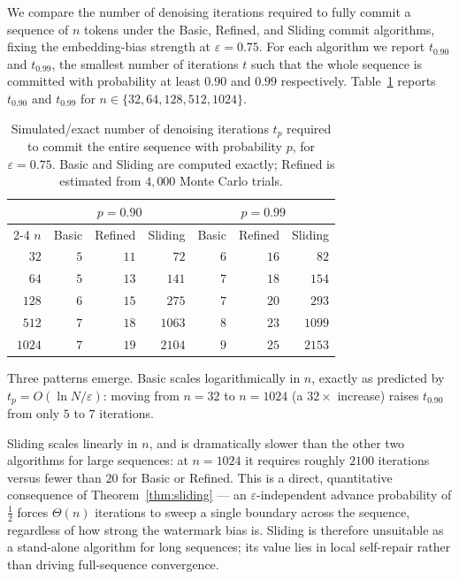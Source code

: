 \documentclass[a4paper,11pt]{llncs}
\begin{document}
\begin{example}
We compare the number of denoising iterations required to fully
commit a sequence of $n$ tokens under the Basic, Refined, and
Sliding commit algorithms, fixing the embedding-bias strength at
$\varepsilon=0.75$. For each algorithm we report $t_{0.90}$ and
$t_{0.99}$, the smallest number of iterations $t$ such that the
whole sequence is committed with probability at least $0.90$ and
$0.99$ respectively.
Table~\ref{tab:sim-comparison} reports $t_{0.90}$ and $t_{0.99}$
for $n\in\{32,64,128,512,1024\}$.
%
\begin{table}[ht]
\centering
\caption{Simulated/exact number of denoising iterations $t_p$
required to commit the entire sequence with probability $p$, for
$\varepsilon=0.75$. Basic and Sliding are computed exactly;
Refined is estimated from $4{,}000$ Monte Carlo trials.}
\label{tab:sim-comparison}
\begin{tabular}{r rrr rrr}
\hline
 & \multicolumn{3}{c}{$p=0.90$} & \multicolumn{3}{c}{$p=0.99$} \\
\cline{2-4}\cline{5-7}
$n$ & Basic & Refined & Sliding & Basic & Refined & Sliding \\
\hline
$32$   & $5$ & $11$ & $72$    & $6$ & $16$ & $82$    \\
$64$   & $5$ & $13$ & $141$   & $7$ & $18$ & $154$   \\
$128$  & $6$ & $15$ & $275$   & $7$ & $20$ & $293$   \\
$512$  & $7$ & $18$ & $1063$  & $8$ & $23$ & $1099$  \\
$1024$ & $7$ & $19$ & $2104$  & $9$ & $25$ & $2153$  \\
\hline
\end{tabular}
\end{table}
Three patterns emerge.
Basic scales logarithmically in $n$, exactly as predicted by
$t_p=O(\ln N/\varepsilon)$: moving from $n=32$ to $n=1024$ (a
$32\times$ increase) raises $t_{0.90}$ from only $5$ to $7$
iterations.

Sliding scales linearly in $n$, and is dramatically slower
than the other two algorithms for large sequences: at $n=1024$ it
requires roughly $2100$ iterations versus fewer than $20$ for
Basic or Refined. This is a direct, quantitative consequence of
Theorem~\ref{thm:sliding} --- an $\varepsilon$-independent advance
probability of $\tfrac12$ forces $\Theta(n)$ iterations to sweep
a single boundary across the sequence, regardless of how strong
the watermark bias is. Sliding is therefore unsuitable as a
stand-alone algorithm for long sequences; its value lies in local
self-repair rather than driving full-sequence convergence.


\end{example}
\end{document}

